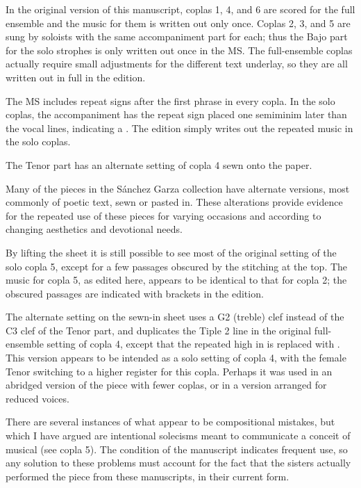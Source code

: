
In the original version of this manuscript, coplas 1, 4, and 6 are scored for 
the full ensemble and the music for them is written out only once.
Coplas 2, 3, and 5 are sung by soloists with the same accompaniment part for 
each; thus the Bajo part for the solo strophes is only written out once in the 
MS.
The full-ensemble coplas actually require small adjustments for the different 
text underlay, so they are all written out in full in the edition.

The MS includes repeat signs after the first phrase in every copla. 
In the solo coplas, the accompaniment has the repeat sign placed one semiminim 
later than the vocal lines, indicating a .
The edition simply writes out the repeated music in the solo coplas.

The Tenor part has an alternate setting of copla 4 sewn onto the paper.%
  \begin{Footnote}
      Many of the pieces in the Sánchez Garza collection have alternate 
      versions, most commonly of poetic text, sewn or pasted in. 
      These alterations provide evidence for the repeated use of these pieces
      for varying occasions and according to changing aesthetics and devotional
      needs.
  \end{Footnote}
By lifting the sheet it is still possible to see most of the original setting 
of the solo copla 5, except for a few passages obscured by the stitching at the 
top.
The music for copla 5, as edited here, appears to be identical to that for 
copla 2; the obscured passages are indicated with brackets in the edition.

The alternate setting on the sewn-in sheet uses a G2 (treble) clef instead of
the C3 clef of the Tenor part, and duplicates the Tiple 2 line in the original
full-ensemble setting of copla 4, except that the repeated high  in 
 is replaced with .
This version appears to be intended as a solo setting of copla 4, with the 
female Tenor switching to a higher register for this copla. 
Perhaps it was used in an abridged version of the piece with fewer coplas, or 
in a version arranged for reduced voices.



There are several instances of what appear to be compositional mistakes, but
which I have argued are intentional solecisms meant to communicate a conceit of
musical  (see copla 5).%
    \Autocite[375--403]{Cashner:PhD}
The condition of the manuscript indicates frequent use, so any solution to 
these problems must account for the fact that the sisters actually performed 
the piece from these manuscripts, in their current form.

